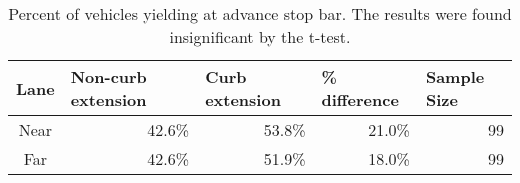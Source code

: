 \begin{table}[!htbp]
\centering
\begin{tabular}{@{}crrrr@{}}
\toprule
\multicolumn{1}{l}{Lane} & \multicolumn{1}{l}{Non-curb extension} & \multicolumn{1}{l}{Curb extension} & \multicolumn{1}{l}{\% difference} & \multicolumn{1}{l}{Sample Size} \\ \midrule
Near                     & 42.6\%                                 & 53.8\%                             & 21.0\%                            & 99                              \\
Far                      & 42.6\%                                 & 51.9\%                             & 18.0\%                            & 99                            \\
\bottomrule 
\end{tabular}
\caption[Percent of vehicles yielding at advance stop bar]{Percent of vehicles yielding at advance stop bar. The results were found insignificant by the t-test.}\label{table:motorist-stop-bar}
\end{table}